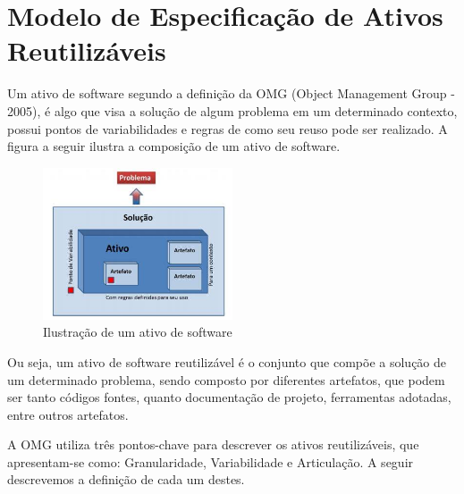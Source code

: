 \section{Modelo de Especificação de Ativos Reutilizáveis}

    Um ativo de software segundo a definição da OMG (Object Management Group - 2005), é algo que visa a solução de algum problema em um determinado contexto, possui pontos de variabilidades e regras de como seu reuso pode ser realizado. A figura a seguir ilustra a composição de um ativo de software.

\begin{figure}[H]
\includegraphics[width=0.5\textwidth]{images/ativo}
\centering
\caption{Ilustração de um ativo de software}
\label{Rotulo}
\end{figure}

  Ou seja, um ativo de software reutilizável é o conjunto que compõe a solução de um determinado problema, sendo composto por diferentes artefatos, que podem ser tanto códigos fontes, quanto documentação de projeto, ferramentas adotadas, entre outros artefatos.
 

    A OMG  utiliza três pontos-chave para descrever os ativos reutilizáveis, que apresentam-se como: Granularidade, Variabilidade e Articulação. A seguir descrevemos a definição de cada um destes.
    
